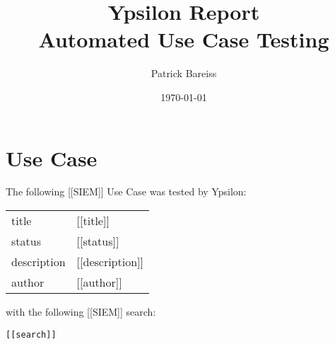 \documentclass{article}
\title{Ypsilon Report \\ Automated Use Case Testing} %
\author{Patrick Bareiss} %
\date{\today} %
\begin{document}
\maketitle %


\section{Use Case}

The following [[SIEM]] Use Case was tested by Ypsilon:

\begin{center}
\begin{tabularx}{\textwidth}{ l X }
title & [[title]] \\
status & [[status]] \\
description & [[description]] \\
author & [[author]] 
\end{tabularx}
\end{center}

with the following [[SIEM]] search:

\begin{lstlisting}[frame=single]
[[search]]
\end{lstlisting}
\end{document}
